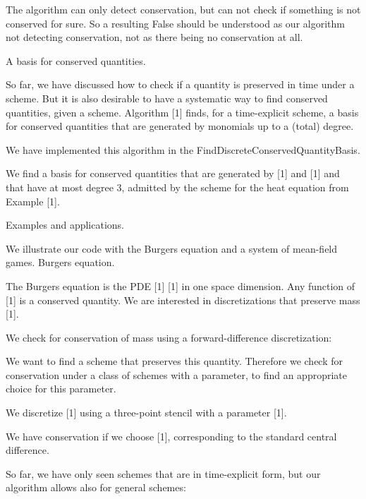 \documentclass{article}
\begin{document}
		
		
		
		
	

	The algorithm can only detect conservation, but can not check if something is not conserved for sure. So a resulting {False} should be understood as our algorithm not detecting conservation, not as there being no conservation at all.

A basis for conserved quantities.



So far, we have discussed how to check if a quantity is preserved in time under a scheme. But it is also desirable to have a systematic way to find conserved quantities, given a scheme.
Algorithm [1] finds, for a time-explicit scheme, a basis for conserved quantities that are generated by monomials up to a (total) degree. 

We have implemented this algorithm in the {FindDiscreteConservedQuantityBasis}.

	We find a basis for conserved quantities that are generated by [1] and [1] and that have at most degree 3, admitted by the scheme for the heat equation from Example [1].
	
	
		
		
	

Examples and applications.



We illustrate our code with the Burgers equation and a system of mean-field games.
Burgers equation.


The Burgers equation is the PDE [1] [1] in one space dimension. Any function of [1] is a conserved quantity. We are interested in discretizations that preserve mass [1].

	We check for conservation of mass using a forward-difference discretization:
	
	
		
		
	

We want to find a scheme that preserves this quantity. Therefore we check for conservation under a class of schemes with a parameter, to find an appropriate choice for this parameter.

	We discretize [1] using a three-point stencil with a parameter [1].
	
	
		
		
	
	We have conservation if we choose [1], corresponding to the standard central difference.

So far, we have only seen schemes that are in time-explicit form, but our algorithm allows also for general schemes:
\end{document}
